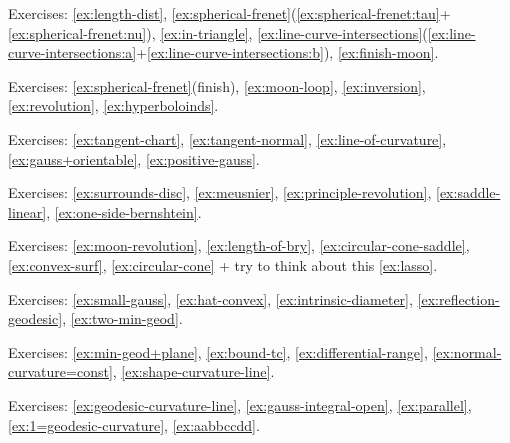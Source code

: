 \noindent{\rule{\textwidth}{.1mm}}


Exercises:
\ref{ex:length-dist},
\ref{ex:spherical-frenet}(\ref{ex:spherical-frenet:tau}+\ref{ex:spherical-frenet:nu}),
\ref{ex:in-triangle},
\ref{ex:line-curve-intersections}(\ref{ex:line-curve-intersections:a}+\ref{ex:line-curve-intersections:b}),
\ref{ex:finish-moon}.

Exercises:
\ref{ex:spherical-frenet}(finish),
\ref{ex:moon-loop},
\ref{ex:inversion},
\ref{ex:revolution},
\ref{ex:hyperboloinds}.

Exercises:
\ref{ex:tangent-chart},
\ref{ex:tangent-normal},
\ref{ex:line-of-curvature},
\ref{ex:gauss+orientable},
\ref{ex:positive-gauss}.

Exercises:
\ref{ex:surrounds-disc},
\ref{ex:meusnier},
\ref{ex:principle-revolution},
\ref{ex:saddle-linear},
\ref{ex:one-side-bernshtein}.

Exercises:
\ref{ex:moon-revolution}, 
\ref{ex:length-of-bry},
\ref{ex:circular-cone-saddle},
\ref{ex:convex-surf},
\ref{ex:circular-cone} 
+ try to think about this \ref{ex:lasso}.

Exercises:
\ref{ex:small-gauss},
\ref{ex:hat-convex},
\ref{ex:intrinsic-diameter},
\ref{ex:reflection-geodesic},
\ref{ex:two-min-geod}.

Exercises:
\ref{ex:min-geod+plane},
\ref{ex:bound-tc},
\ref{ex:differential-range},
\ref{ex:normal-curvature=const},
\ref{ex:shape-curvature-line}.

Exercises: 
\ref{ex:geodesic-curvature-line},
\ref{ex:gauss-integral-open},
\ref{ex:parallel},
\ref{ex:1=geodesic-curvature},
\ref{ex:aabbccdd}.


\noindent{\rule{\textwidth}{.1mm}}

